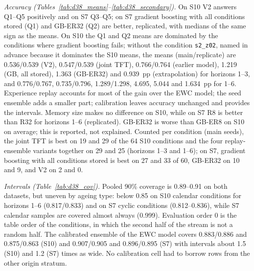 \documentclass[conference]{IEEEtran}
\begin{document}
\emph{Accuracy (Tables~\ref{tab:d38_means}--\ref{tab:d38_secondary}).} On S10 V2 answers Q1--Q5 positively and on S7
Q3--Q5; on S7 gradient boosting with all conditions stored (Q1) and GB-ER32 (Q2) are better, replicated, with medians of
the same sign as the means. On S10 the Q1 and Q2 means are dominated by the conditions where gradient boosting fails;
without the condition \texttt{s2\_z02}, named in advance because it dominates the S10 means, the means (main/replicate)
are 0.536/0.539 (V2), 0.547/0.539 (joint TFT), 0.766/0.764 (earlier model), 1.219 (GB, all stored), 1.363 (GB-ER32)
and 0.939~pp (extrapolation) for horizons 1--3, and 0.776/0.767, 0.735/0.796, 1.289/1.298, 4.695, 5.044 and 1.634~pp
for 1--6. Experience replay accounts for most of the gain over the EWC model; the seed ensemble adds a smaller part;
calibration leaves accuracy unchanged and provides the intervals. Memory size makes no difference on S10, while on S7
R8 is better than R32 for horizons 1--6 (replicated). GB-ER32 is worse than GB-ER8 on S10 on average; this is reported,
not explained. Counted per condition (main seeds), the joint TFT is best on 19 and 29 of the 64 S10 conditions and the
four replay-ensemble variants together on 29 and 25 (horizons 1--3 and 1--6); on S7, gradient boosting with all
conditions stored is best on 27 and 33 of 60, GB-ER32 on 10 and 9, and V2 on 2 and 0.

\emph{Intervals (Table~\ref{tab:d38_cov}).} Pooled 90\% coverage is 0.89--0.91 on both datasets, but uneven by ageing
type: below 0.85 on S10 calendar conditions for horizons 1--6 (0.817/0.833) and on S7 cyclic conditions (0.812--0.836),
while S7 calendar samples are covered almost always (0.999). Evaluation order 0 is the table order of the conditions,
in which the second half of the stream is not a random half. The calibrated ensemble of the EWC model covers
0.883/0.886 and 0.875/0.863 (S10) and 0.907/0.905 and 0.896/0.895 (S7) with intervals about 1.5 (S10) and 1.2 (S7)
times as wide. No calibration cell had to borrow rows from the other origin stratum.
\end{document}

